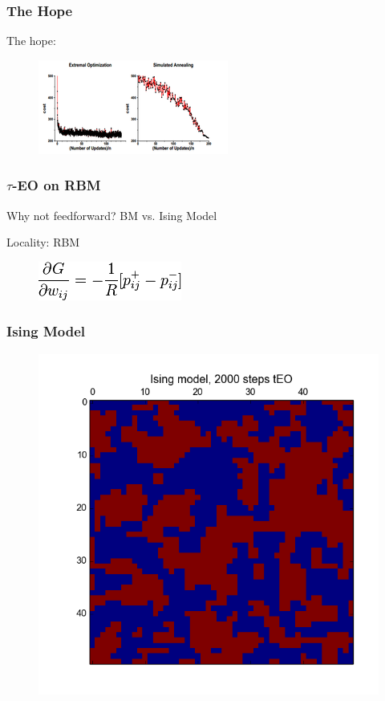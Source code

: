 \documentclass{beamer}
\begin{document}
\begin{frame}
  \frametitle{The Hope}
  The hope:
  \begin{figure}
    \includegraphics{boettcher}
  \end{figure}
\end{frame}

\begin{frame}
  \frametitle{$\tau$-EO on RBM}
  Why not feedforward? BM vs. Ising Model

  Locality: RBM

  \begin{figure}
    \includegraphics{rbm_eq}
  \end{figure}
\end{frame}

\begin{frame}
  \frametitle{Ising Model}
  \begin{figure}
    \includegraphics{2000}
  \end{figure}
\end{frame}
\end{document}
